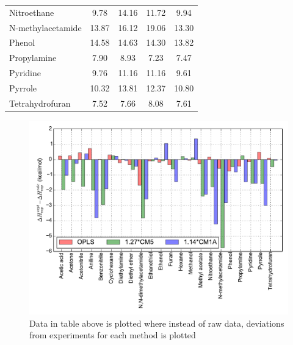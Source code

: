 \documentclass[11pt,fleqn]{book} %
\begin{document}
\begin{table}
\begin{tabular}{lcccc}
          Nitroethane &       9.78 &      14.16 &     11.72 &       9.94 \\
    N-methylacetamide &      13.87 &      16.12 &     19.06 &      13.30 \\
               Phenol &      14.58 &      14.63 &     14.30 &      13.82 \\
          Propylamine &       7.90 &       8.93 &      7.23 &       7.47 \\
             Pyridine &       9.76 &      11.16 &     11.16 &       9.61 \\
              Pyrrole &      10.32 &      13.81 &     12.37 &      10.80 \\
      Tetrahydrofuran &       7.52 &       7.66 &      8.08 &       7.61 \\
\bottomrule
\end{tabular}
\end{table}
\pagebreak 

\begin{figure}
\includegraphics[scale=0.80]{../python_recipies/Tesh_hvap.pdf}
\caption{Data in table above is plotted where instead of raw data, deviations from experiments for each method is plotted}
\end{figure}
\pagebreak 

\end{document}
